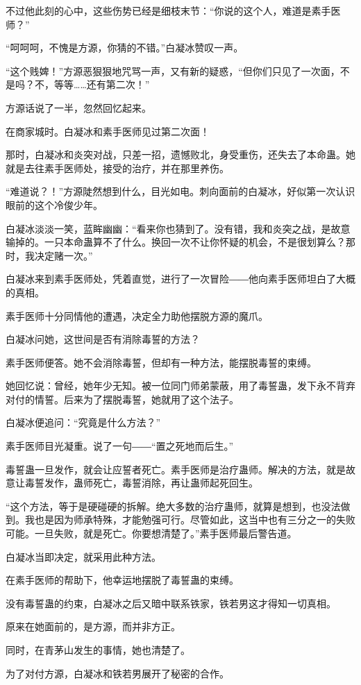 \begin{this_body}
不过他此刻的心中，这些伤势已经是细枝末节：“你说的这个人，难道是素手医师？”

“呵呵呵，不愧是方源，你猜的不错。”白凝冰赞叹一声。

“这个贱婢！”方源恶狠狠地咒骂一声，又有新的疑惑，“但你们只见了一次面，不是吗？不，等等……还有第二次！”

方源话说了一半，忽然回忆起来。

在商家城时。白凝冰和素手医师见过第二次面！

那时，白凝冰和炎突对战，只差一招，遗憾败北，身受重伤，还失去了本命蛊。她就是去往素手医师处，接受的治疗，并在那里养伤。

“难道说？！”方源陡然想到什么，目光如电。刺向面前的白凝冰，好似第一次认识眼前的这个冷俊少年。

白凝冰淡淡一笑，蓝眸幽幽：“看来你也猜到了。没有错，我和炎突之战，是故意输掉的。一只本命蛊算不了什么。换回一次不让你怀疑的机会，不是很划算么？那时，我决定赌一次。”

白凝冰来到素手医师处，凭着直觉，进行了一次冒险――他向素手医师坦白了大概的真相。

素手医师十分同情他的遭遇，决定全力助他摆脱方源的魔爪。

白凝冰问她，这世间是否有消除毒誓的方法？

素手医师便答。她不会消除毒誓，但却有一种方法，能摆脱毒誓的束缚。

她回忆说：曾经，她年少无知。被一位同门师弟蒙蔽，用了毒誓蛊，发下永不背弃对付的情誓。后来为了摆脱毒誓，她就用了这个法子。

白凝冰便追问：“究竟是什么方法？”

素手医师目光凝重。说了一句――“置之死地而后生。”

毒誓蛊一旦发作，就会让应誓者死亡。素手医师是治疗蛊师。解决的方法，就是故意让毒誓发作，蛊师死亡，毒誓消除，再让蛊师起死回生。

“这个方法，等于是硬碰硬的拆解。绝大多数的治疗蛊师，就算是想到，也没法做到。我也是因为师承特殊，才能勉强可行。尽管如此，这当中也有三分之一的失败可能。一旦失败，就是死亡。你要想清楚了。”素手医师最后警告道。

白凝冰当即决定，就采用此种方法。

在素手医师的帮助下，他幸运地摆脱了毒誓蛊的束缚。

没有毒誓蛊的约束，白凝冰之后又暗中联系铁家，铁若男这才得知一切真相。

原来在她面前的，是方源，而并非方正。

同时，在青茅山发生的事情，她也清楚了。

为了对付方源，白凝冰和铁若男展开了秘密的合作。


\end{this_body}
